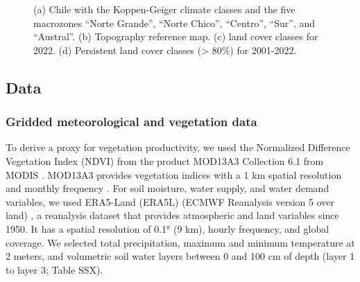\documentclass[
  sn-nature,
  numbered]{sn-jnl}
\begin{document}
\begin{figure}[!ht]


\caption{\label{fig-studyArea}(a) Chile with the Koppen-Geiger climate
classes and the five macrozones ``Norte Grande'', ``Norte Chico'',
``Centro'', ``Sur'', and ``Austral''. (b) Topography reference map. (c)
land cover classes for 2022. (d) Persistent land cover classes
(\textgreater{} 80\%) for 2001-2022.}

\end{figure}%

\subsection{Data}\label{data}

\subsubsection{Gridded meteorological and vegetation
data}\label{gridded-meteorological-and-vegetation-data}

To derive a proxy for vegetation productivity, we used the Normalized
Difference Vegetation Index (NDVI) from the product MOD13A3 Collection
6.1 from MODIS . MOD13A3 provides vegetation indices with a 1 km spatial
resolution and monthly frequency \citep{Didan2015}. For soil moisture,
water supply, and water demand variables, we used ERA5-Land (ERA5L)
(ECMWF Reanalysis version 5 over land) \citep{MunozSabater2021}, a
reanalysis dataset that provides atmospheric and land variables since
1950. It has a spatial resolution of 0.1° (9 km), hourly frequency, and
global coverage. We selected total precipitation, maximum and minimum
temperature at 2 meters, and volumetric soil water layers between 0 and
100 cm of depth (layer 1 to layer 3; Table SSX).
\end{document}
